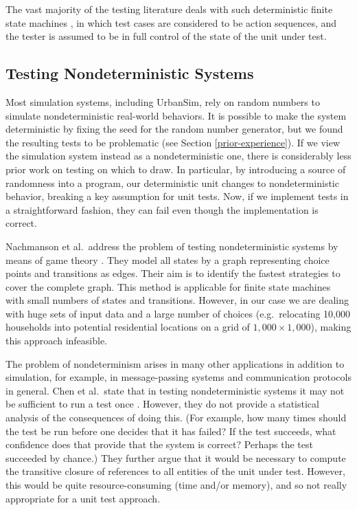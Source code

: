 \documentclass{sig-alternate}
\begin{document}
The vast majority of the testing literature deals with such deterministic
finite state machines \cite{lee:1996,sidhu:1989,yannakakis:1991}, in which
test cases are considered to be action sequences, and the tester is assumed
to be in full control of the state of the unit under test.

\subsection{Testing Nondeterministic Systems}

Most simulation systems, including UrbanSim, rely on random numbers
to simulate nondeterministic real-world behaviors.  It is
possible to make the system deterministic by fixing the seed for the random
number generator, but we found the resulting tests to be problematic
(see Section \ref{prior-experience}).  If we view the simulation system instead
as a nondeterministic one, there is considerably less prior work on testing on
which to draw.  In particular, by introducing a source of randomness into a
program, our deterministic unit changes to nondeterministic behavior,
breaking a key assumption for unit tests.  Now, if we implement tests in a
straightforward fashion, they can fail even though the implementation is
correct.

Nachmanson et al.\ address the problem of testing nondeterministic systems by 
means of game theory \cite{nachmanson:2004}. They model all states by a graph 
representing choice points and transitions as edges. Their aim is to identify 
the fastest strategies to cover the complete graph. This method is applicable 
for finite state machines with small numbers of states and transitions.
However, in our case we are dealing with huge sets of input data and a large
number of choices (e.g.\ relocating 10,000 households into potential
residential locations on a grid of $1,000\times 1,000$), making this
approach infeasible.

The problem of nondeterminism arises in many other applications in addition
to simulation, for example, in message-passing systems
\cite{kranzmuller:1998} and communication protocols in general.  Chen et
al.\ state that in testing nondeterministic systems it may not be
sufficient to run a test once \cite[p.~217]{chen:1994}. However, they do
not provide a statistical analysis of the consequences of doing this.  (For
example, how many times should the test be run before one decides that it
has failed?  If the test succeeds, what confidence does that provide that
the system is correct?  Perhaps the test succeeded by chance.) They further
argue that it would be necessary to compute the transitive closure of
references to all entities of the unit under test.  However, this would be
quite resource-consuming (time and/or memory), and so not really
appropriate for a unit test approach.
\end{document}
